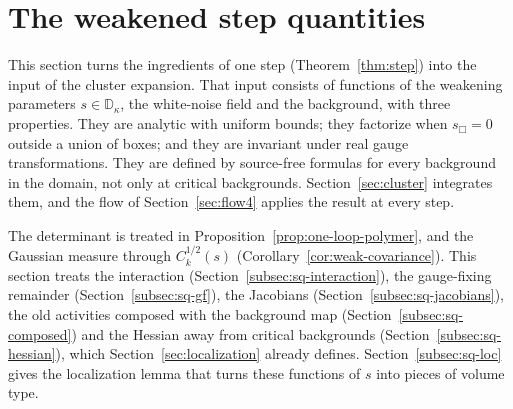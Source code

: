 \section{The weakened step quantities}\label{sec:step-quantities}

This section turns the ingredients of one step (Theorem~\ref{thm:step}) into the input of the cluster expansion. That input consists of functions of the weakening parameters $s\in\mathbb D_\kappa$, the white-noise field and the background, with three properties. They are analytic with uniform bounds; they factorize when $s_\Box=0$ outside a union of boxes; and they are invariant under real gauge transformations. They are defined by source-free formulas for every background in the domain, not only at critical backgrounds. Section~\ref{sec:cluster} integrates them, and the flow of Section~\ref{sec:flow4} applies the result at every step.

The determinant is treated in Proposition~\ref{prop:one-loop-polymer}, and the Gaussian measure through $C_k^{1/2}(s)$ (Corollary~\ref{cor:weak-covariance}). This section treats the interaction (Section~\ref{subsec:sq-interaction}), the gauge-fixing remainder (Section~\ref{subsec:sq-gf}), the Jacobians (Section~\ref{subsec:sq-jacobians}), the old activities composed with the background map (Section~\ref{subsec:sq-composed}) and the Hessian away from critical backgrounds (Section~\ref{subsec:sq-hessian}), which Section~\ref{sec:localization} already defines. Section~\ref{subsec:sq-loc} gives the localization lemma that turns these functions of $s$ into pieces of volume type.

